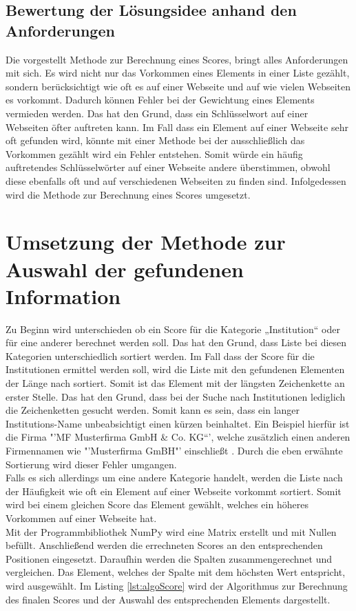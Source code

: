 	\subsection{Bewertung der Lösungsidee anhand den Anforderungen}
	Die vorgestellt Methode zur Berechnung eines Scores, bringt alles Anforderungen mit sich. Es wird nicht nur das Vorkommen eines Elements in einer Liste gezählt, sondern berücksichtigt wie oft es auf einer Webseite und auf wie vielen Webseiten es vorkommt. Dadurch können Fehler bei der Gewichtung eines Elements vermieden werden. Das hat den Grund, dass  ein Schlüsselwort auf einer Webseiten öfter auftreten kann. Im Fall dass ein Element auf einer Webseite sehr oft gefunden wird, könnte mit einer Methode bei der ausschließlich das Vorkommen gezählt wird ein Fehler entstehen.  Somit würde ein häufig auftretendes Schlüsselwörter auf einer Webseite andere überstimmen, obwohl diese ebenfalls oft und auf verschiedenen Webseiten zu finden sind. Infolgedessen wird die Methode zur Berechnung eines Scores umgesetzt.
	
\section{Umsetzung der Methode zur Auswahl der gefundenen Information}
\label{subsec:AuswahlInformation}
Zu Beginn wird unterschieden ob ein Score für die Kategorie „Institution“ oder für eine anderer berechnet werden soll. Das hat den Grund, dass Liste bei diesen Kategorien unterschiedlich sortiert werden. Im Fall dass der Score für die Institutionen  ermittel werden soll, wird die Liste mit den gefundenen Elementen der Länge nach sortiert. Somit ist das Element mit der längsten Zeichenkette an erster Stelle. Das hat den Grund, dass bei der Suche nach Institutionen lediglich die Zeichenketten gesucht werden. Somit kann es sein, dass ein langer Institutions-Name unbeabsichtigt einen kürzen beinhaltet. Ein Beispiel hierfür ist die Firma "'MF Musterfirma GmbH \& Co. KG“', welche zusätzlich einen anderen Firmennamen wie "'Musterfirma GmBH"' einschließt . Durch die eben erwähnte Sortierung wird dieser Fehler umgangen. \\
Falls es sich allerdings um eine andere Kategorie handelt, werden die Liste nach der Häufigkeit wie oft ein Element auf einer Webseite vorkommt sortiert. Somit wird bei einem gleichen Score das Element gewählt, welches ein höheres Vorkommen auf einer Webseite hat.\\
Mit der Programmbibliothek  NumPy wird eine Matrix erstellt und mit Nullen befüllt. Anschließend werden die errechneten Scores an den entsprechenden Positionen eingesetzt. Daraufhin werden die Spalten zusammengerechnet und vergleichen. Das Element, welches der Spalte mit dem höchsten Wert entspricht, wird ausgewählt. Im Listing \ref{lst:algoScore} wird der Algorithmus zur Berechnung des finalen Scores und der  Auswahl des entsprechenden Elements dargestellt.\\

